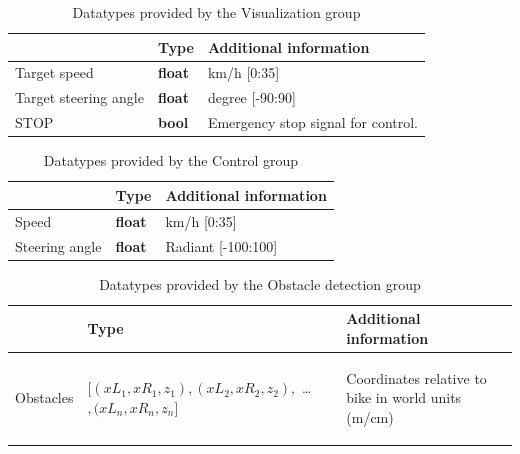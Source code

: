 \documentclass[]{scrreprt}
\begin{document}
	\begin{table}[H]
		\centering
		\begin{tabular}{|l|l|l|}
			\hline 
			& Type & Additional information \\ 
			\hline \hline
			Target speed & \textbf{float} & km/h [0:35] \\ 
			\hline 
			Target steering angle & \textbf{float} & degree [-90:90] \\ 
			\hline 
			STOP & \textbf{bool} & Emergency stop signal for control. \\ 
			\hline 
		\end{tabular}
		\caption[Interfaces I]{Datatypes provided by the Visualization group}
		\label{tab:IntVis}
	\end{table}

	\begin{table}[H]
		\centering
		\begin{tabular}{|l|l|l|}
			\hline 
			& Type & Additional information \\ 
			\hline \hline
			Speed & \textbf{float} & km/h [0:35] \\ 
			\hline 
			Steering angle & \textbf{float} & Radiant [-100:100] \\ 
			\hline
		\end{tabular}
		\caption[Interfaces II]{Datatypes provided by the Control group}
		\label{tab:IntCont}
	\end{table}

	\begin{table}[H]
		\centering
		\begin{tabular}{|l|l|l|}
			\hline 
			& Type & Additional information \\ 
			\hline \hline
			Obstacles &
			\begin{pbox}{5.0cm}{\vspace{.2\baselineskip}
				$[(xL_1, xR_1, z_1), (xL_2, xR_2, z_2),$ \dots$,(xL_n, xR_n, z_n]$
				\vspace{.3\baselineskip}}
			\end{pbox}
			& \begin{pbox}{5.0cm}{\vspace{.2\baselineskip}
				Coordinates relative to bike in world units (m/cm)
				\vspace{.3\baselineskip}}
			\end{pbox}\\
			\hline
		\end{tabular}
		\caption[Interfaces III]{Datatypes provided by the Obstacle detection group}
		\label{tab:IntObst}	
	\end{table}
	
\end{document}
